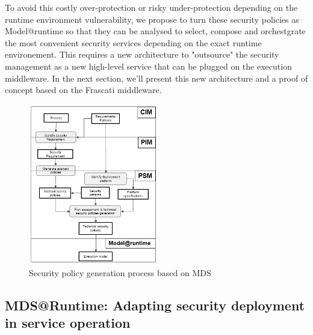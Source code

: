 \documentclass[runningheads,a4paper]{llncs}
\begin{document}
To avoid this costly over-protection or risky under-protection depending on the runtime environment vulnerability, we propose to turn these security policies as Model@runtime so that they can be analysed to select, compose and orchestgrate the most convenient security services depending on the exact runtime environement. This requires a new architecture to "outsource" the security management as a new high-level service that can be plugged on the execution middleware. In the next section, we'll present this new architecture and a proof of concept based on the Frascati middleware.






\begin{figure}  

\centering
\includegraphics[height=200pt, width=160pt]{mds.png}
\caption{Security policy generation process based on MDS}
\label{fig:mds}
\end{figure}




\subsection{MDS@Runtime: Adapting security deployment in service operation}
\end{document}
